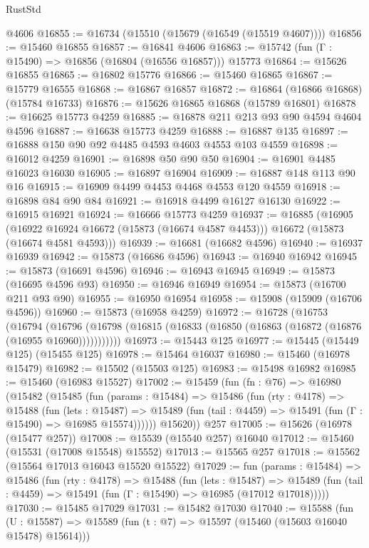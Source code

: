 \begin{lexlean}{RustStd}
\begin{coremodule}
    @4606
@16855 := @16734 (@15510 (@15679 (@16549 (@15519 @4607))))
@16856 := @15460 @16855
@16857 := @16841 @4606
@16863 := @15742 (fun (Γ : @15490) => @16856 (@16804 (@16556 @16857))) @15773
@16864 := @15626 @16855
@16865 := @16802 @15776
@16866 := @15460 @16865
@16867 := @15779 @16555
@16868 := @16867 @16857
@16872 := @16864 (@16866 @16868) (@15784 @16733)
@16876 := @15626 @16865 @16868 (@15789 @16801)
@16878 := @16625 @15773 @4259
@16885 := @16878 @211 @213 @93 @90 @4594 @4604 @4596
@16887 := @16638 @15773 @4259
@16888 := @16887 @135
@16897 := @16888 @150 @90 @92 @4485 @4593 @4603 @4553 @103 @4559
@16898 := @16012 @4259
@16901 := @16898 @50 @90 @50
@16904 := @16901 @4485 @16023 @16030
@16905 := @16897 @16904
@16909 := @16887 @148 @113 @90 @16
@16915 := @16909 @4499 @4453 @4468 @4553 @120 @4559
@16918 := @16898 @84 @90 @84
@16921 := @16918 @4499 @16127 @16130
@16922 := @16915 @16921
@16924 := @16666 @15773 @4259
@16937 := @16885
    (@16905
      (@16922 @16924 @16672 (@15873 (@16674 @4587 @4453)))
      @16672
      (@15873 (@16674 @4581 @4593)))
@16939 := @16681 (@16682 @4596)
@16940 := @16937 @16939
@16942 := @15873 (@16686 @4596)
@16943 := @16940 @16942
@16945 := @15873 (@16691 @4596)
@16946 := @16943 @16945
@16949 := @15873 (@16695 @4596 @93)
@16950 := @16946 @16949
@16954 := @15873 (@16700 @211 @93 @90)
@16955 := @16950 @16954
@16958 := @15908 (@15909 (@16706 @4596))
@16960 := @15873 (@16958 @4259)
@16972 := @16728
    (@16753
      (@16794
        (@16796 (@16798 (@16815 (@16833 (@16850 (@16863 (@16872 (@16876 (@16955 @16960)))))))))))
@16973 := @15443 @125
@16977 := @15445 (@15449 @125) (@15455 @125)
@16978 := @15464 @16037
@16980 := @15460 (@16978 @15479)
@16982 := @15502 (@15503 @125)
@16983 := @15498 @16982
@16985 := @15460 (@16983 @15527)
@17002 := @15459
    (fun (fn : @76) =>
    @16980
      (@15482
        (@15485
          (fun (params : @15484) =>
          @15486
            (fun (rty : @4178) =>
            @15488
              (fun (lets : @15487) =>
              @15489 (fun (tail : @4459) => @15491 (fun (Γ : @15490) => @16985 @15574))))))
        @15620))
    @257
@17005 := @15626 (@16978 (@15477 @257))
@17008 := @15539 (@15540 @257) @16040
@17012 := @15460 (@15531 (@17008 @15548) @15552)
@17013 := @15565 @257
@17018 := @15562 (@15564 @17013 @16043 @15520 @15522)
@17029 := fun (params : @15484) =>
  @15486
    (fun (rty : @4178) =>
    @15488
      (fun (lets : @15487) =>
      @15489 (fun (tail : @4459) => @15491 (fun (Γ : @15490) => @16985 (@17012 @17018)))))
@17030 := @15485 @17029
@17031 := @15482 @17030
@17040 := @15588
    (fun (U : @15587) => @15589 (fun (t : @7) => @15597 (@15460 (@15603 @16040 @15478) @15614)))

\end{coremodule}
\end{lexlean}
